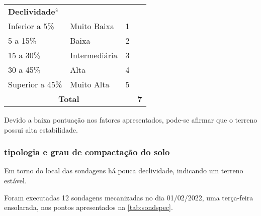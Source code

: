\begin{table}[htb!]
\begin{tabularx}{\textwidth}{@{\hspace{1cm}}Xlcc}
		\multicolumn{3}{l}{\bfseries Declividade$\footnotesize^3$}\\\cmidrule{1-1}
		Inferior a 5\% & Muito Baixa & 1& \Square\\
		5 a 15\% & Baixa & 2& \CheckedBox\\
		15 a 30\% & Intermediária & 3& \Square\\
		30 a 45\% & Alta & 4& \Square\\
		Superior a 45\% & Muito Alta & 5& \Square\\
		\midrule
		\multicolumn{3}{c}{\bfseries Total} & \bfseries7\\
		
		\bottomrule
	\end{tabularx}
\end{table}

\FloatBarrier

Devido a baixa pontuação nos fatores apresentados, pode-se afirmar que o terreno possui alta estabilidade.

\subsubsection{tipologia e grau de compactação do solo}

Em torno do local das sondagens há pouca declividade,
indicando um terreno estável.

Foram executadas 12 sondagens mecanizadas no dia
01/02/2022, uma terça-feira ensolarada, nos pontos
apresentados na \cref{tab:sondspec}. 

